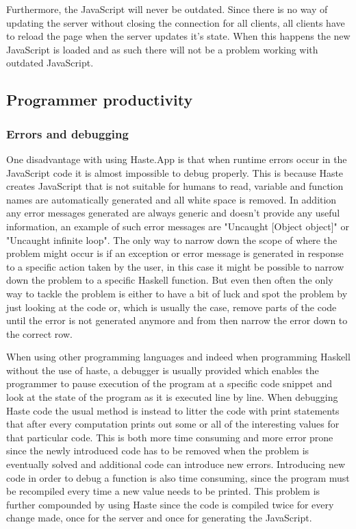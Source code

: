 \documentclass[a4paper]{article}
\begin{document}
Furthermore, the JavaScript will never be outdated. Since there is no way of updating the server without closing the connection for all clients, all clients have to reload the page when the server updates it's state. When this happens the new JavaScript is loaded and as such there will not be a problem working with outdated JavaScript. 



\subsection{Programmer productivity}
\subsubsection{Errors and debugging} 
One disadvantage with using Haste.App is that when runtime errors occur in the JavaScript code it is almost impossible to debug properly. This is because Haste creates JavaScript that is not suitable for humans to read, variable and function names are automatically generated and all white space is removed. In addition any error messages generated are always generic and doesn't provide any useful information, an example of such error messages are "Uncaught [Object object]" or "Uncaught infinite loop". The only way to narrow down the scope of where the problem might occur is if an exception or error message is generated in response to a specific action taken by the user, in this case it might be possible to narrow down the problem to a specific Haskell function. But even then often the only way to tackle the problem is either to have a bit of luck and spot the problem by just looking at the code or, which is usually the case, remove parts of the code until the error is not generated anymore and from then narrow the error down to the correct row.

When using other programming languages and indeed when programming Haskell without the use of haste, a debugger is usually provided which enables the programmer to pause execution of the program at a specific code snippet and look at the state of the program as it is executed line by line. When debugging Haste code the usual method is instead to litter the code with print statements that after every computation prints out some or all of the interesting values for that particular code. This is both more time consuming and more error prone since the newly introduced code has to be removed when the problem is eventually solved and additional code can introduce new errors. Introducing new code in order to debug a function is also time consuming, since the program must be recompiled every time a new value needs to be printed. This problem is further compounded by using Haste since the code is compiled twice for every change made, once for the server and once for generating the JavaScript.
\end{document}

